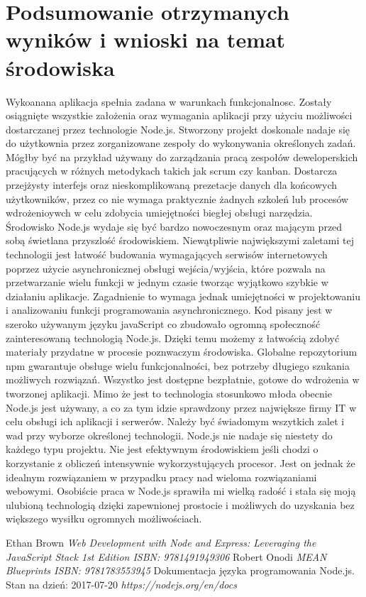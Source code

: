 \documentclass[12pt]{report}
\begin{document}
\chapter{Podsumowanie otrzymanych wyników i wnioski na temat środowiska}
Wykoanana aplikacja spełnia zadana w warunkach funkcjonalnosc. 
Zostały osiągnięte wszystkie założenia oraz wymagania aplikacji przy użyciu możliwości dostarczanej przez technologie Node.js. 
Stworzony projekt doskonale nadaje się do użytkownia przez zorganizowane zespoły do wykonywania określonych zadań. 
Mógłby być na przykład używany do zarządzania pracą zespołów deweloperskich pracujących w różnych metodykach takich jak scrum czy kanban. 
Dostarcza przejżysty interfejs oraz nieskomplikowaną prezetacje danych dla końcowych użytkowników, przez co nie wymaga praktycznie żadnych szkoleń lub procesów wdrożenioywch w celu zdobycia umiejętności biegłej obsługi narzędzia. 
Środowisko Node.js wydaje się być bardzo nowoczesnym oraz mającym przed sobą świetlana przyszlość środowiskiem. 
Niewątpliwie największymi zaletami tej technologii jest łatwość budowania wymagających serwisów internetowych poprzez użycie asynchronicznej obsługi wejścia/wyjścia, które pozwala na przetwarzanie wielu funkcji w jednym czasie tworząc wyjątkowo szybkie w działaniu aplikacje. 
Zagadnienie to wymaga jednak umiejętności w projektowaniu i analizowaniu funkcji programowania asynchronicznego. 
Kod pisany jest w szeroko używanym języku javaScript co zbudowało ogromną społeczność zainteresowaną technologią Node.js. 
Dzięki temu możemy z łatwością zdobyć materiały przydatne w procesie poznwaczym środowiska. 
Globalne repozytorium npm gwarantuje obsługe wielu funkcjonalności, bez potrzeby długiego szukania możliwych rozwiązań. 
Wszystko jest dostępne bezpłatnie, gotowe do wdrożenia w tworzonej aplikacji. 
Mimo że jest to technologia stosunkowo młoda obecnie Node.js jest używany, a co za tym idzie sprawdzony przez największe firmy IT w celu obsługi ich aplikacji i serwerów. 
Należy być świadomym wszytkich zalet i wad przy wyborze określonej technologii. 
Node.js nie nadaje się niestety do każdego typu projektu. 
Nie jest efektywnym środowiskiem jeśli chodzi o korzystanie z obliczeń intensywnie wykorzystujących procesor. 
Jest on jednak że idealnym rozwiązaniem w przypadku pracy nad wieloma rozwiązaniami webowymi. 
Osobiście praca w Node.js sprawiła mi wielką radość i stała się moją ulubioną technologią dzięki zapewnionej prostocie i możliwych do uzyskania bez większego wysiłku ogromnych możliwościach.

\begin{thebibliography}{99}
Ethan Brown
\textit{Web Development with Node and Express: Leveraging the JavaScript Stack 1st Edition ISBN: 9781491949306}
Robert Onodi
\textit{MEAN Blueprints ISBN: 9781783553945}
Dokumentacja języka programowania Node.js. Stan na dzień: 2017-07-20
\textit{https://nodejs.org/en/docs}

\end{thebibliography}

\listoffigures
\end{document}
